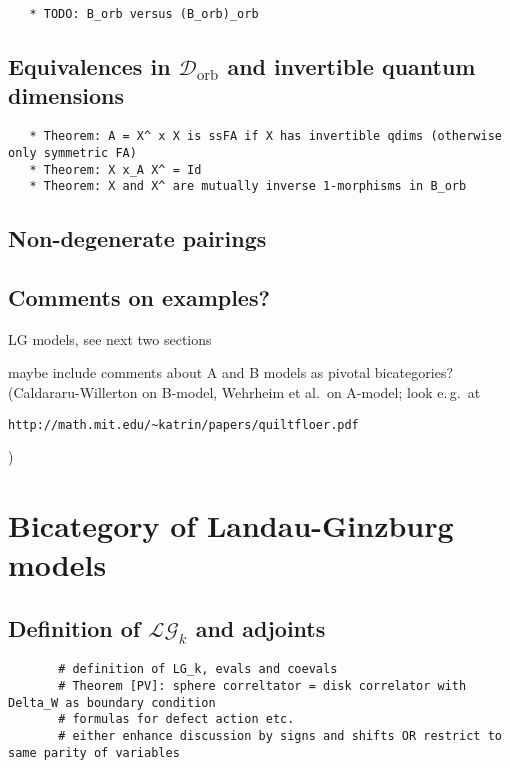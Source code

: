 \documentclass[12pt]{scrartcl}
\theoremstyle{definition}
\numberwithin{equation}{section}
\numberwithin{definition}{section}
\numberwithin{figure}{section}
\begin{document}
\begin{verbatim}
   * TODO: B_orb versus (B_orb)_orb
\end{verbatim}

\subsection{Equivalences in $\mathcal{D}_\mathrm{orb}$ and invertible quantum dimensions}

\begin{verbatim}
   * Theorem: A = X^ x X is ssFA if X has invertible qdims (otherwise only symmetric FA)
   * Theorem: X x_A X^ = Id
   * Theorem: X and X^ are mutually inverse 1-morphisms in B_orb
\end{verbatim}

\subsection{Non-degenerate pairings}

\subsection{Comments on examples?}

LG models, see next two sections

maybe include comments about A and B models as pivotal bicategories? (Caldararu-Willerton on B-model, Wehrheim et al.~on A-model; look e.\,g.~at \begin{verbatim}
http://math.mit.edu/~katrin/papers/quiltfloer.pdf
\end{verbatim})



\section{Bicategory of Landau-Ginzburg models}

\subsection{Definition of $\mathcal{LG}_k$ and adjoints}

\begin{verbatim}
       # definition of LG_k, evals and coevals
       # Theorem [PV]: sphere correltator = disk correlator with Delta_W as boundary condition 
       # formulas for defect action etc. 
       # either enhance discussion by signs and shifts OR restrict to same parity of variables
\end{verbatim}
\end{document}
